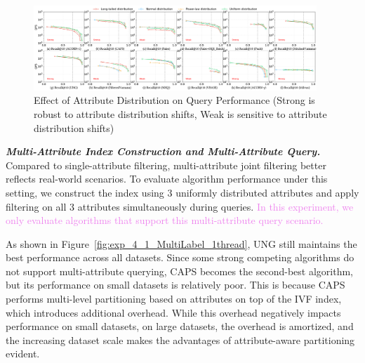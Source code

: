 \documentclass[sigconf, nonacm]{acmart}
\begin{document}
{	
	\begin{figure}
	\centering

	\includegraphics[width=0.95\textwidth]{figures/exp/exp_3_1.pdf}
	\caption{Effect of Attribute Distribution on Query Performance (Strong is robust to attribute distribution shifts, Weak is sensitive to attribute distribution shifts)}
	\label{fig:exp_3_1}

	\end{figure}
	
	
	
	
	
	\textit{\textbf{Multi-Attribute Index Construction and Multi-Attribute Query.}}  
	Compared to single-attribute filtering, multi-attribute joint filtering better reflects real-world scenarios. To evaluate algorithm performance under this setting, we construct the index using 3 uniformly distributed attributes and apply filtering on all 3 attributes simultaneously during queries. \textcolor{violet}{In this experiment, we only evaluate algorithms that support this multi-attribute query scenario.}
	
	As shown in Figure~\ref{fig:exp_4_1_MultiLabel_1thread}, UNG still maintains the best performance across all datasets. Since some strong competing algorithms do not support multi-attribute querying, CAPS becomes the second-best algorithm, but its performance on small datasets is relatively poor. This is because CAPS performs multi-level partitioning based on attributes on top of the IVF index, which introduces additional overhead. While this overhead negatively impacts performance on small datasets, on large datasets, the overhead is amortized, and the increasing dataset scale makes the advantages of attribute-aware partitioning evident.
	
}
\end{document}
